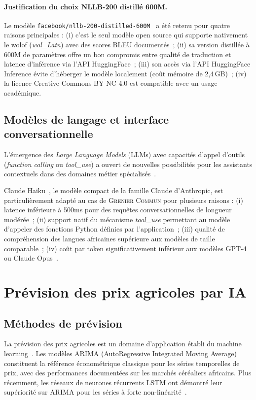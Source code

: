 \documentclass[12pt,a4paper,twoside]{report}
\newcommand{\gc}{\textsc{Grenier Commun}}
\begin{document}
\paragraph{Justification du choix NLLB-200 distillé 600M.}
Le modèle \texttt{facebook/nllb-200-distilled-600M}~\cite{fan2022nllb,huggingface2024nllb}
a été retenu pour quatre raisons principales :
(i) c'est le seul modèle open source qui supporte nativement le wolof (\emph{wol\_Latn})
avec des scores BLEU documentés~;
(ii) sa version distillée à 600M de paramètres offre un bon compromis entre qualité
de traduction et latence d'inférence via l'API HuggingFace~;
(iii) son accès via l'API HuggingFace Inference évite d'héberger le modèle
localement (coût mémoire de 2,4\,GB)~;
(iv) la licence Creative Commons BY-NC 4.0 est compatible avec un usage académique.

\subsection{Modèles de langage et interface conversationnelle}

L'émergence des \emph{Large Language Models} (LLMs) avec capacités d'appel d'outils
(\emph{function calling} ou \emph{tool\_use}) a ouvert de nouvelles possibilités
pour les assistants contextuels dans des domaines métier spécialisés~\cite{brown2020gpt3}.

Claude Haiku~\cite{anthropic2024haiku}, le modèle compact de la famille Claude
d'Anthropic, est particulièrement adapté au cas de \gc{} pour plusieurs raisons :
(i) latence inférieure à 500ms pour des requêtes conversationnelles de longueur
modérée~; (ii) support natif du mécanisme \emph{tool\_use} permettant au modèle
d'appeler des fonctions Python définies par l'application~;
(iii) qualité de compréhension des langues africaines supérieure aux modèles
de taille comparable~; (iv) coût par token significativement inférieur aux modèles
GPT-4 ou Claude Opus~\cite{anthropic2024claude}.

\section{Prévision des prix agricoles par IA}

\subsection{Méthodes de prévision}

La prévision des prix agricoles est un domaine d'application établi du machine
learning~\cite{ghosh2019arima}. Les modèles ARIMA (AutoRegressive Integrated
Moving Average) constituent la référence économétrique classique pour les séries
temporelles de prix, avec des performances documentées sur les marchés céréaliers
africains. Plus récemment, les réseaux de neurones récurrents LSTM ont démontré
leur supériorité sur ARIMA pour les séries à forte non-linéarité~\cite{cao2019lstm}.
\end{document}
